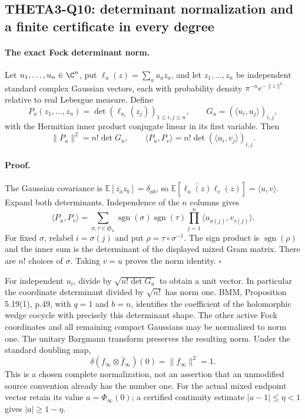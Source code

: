 
\subsection{THETA3-Q10: determinant normalization and a finite certificate in every degree}\label{Q10}

\paragraph{The exact Fock determinant norm.}
Let $u_1,\ldots,u_n\in\C^n$, put
$\ell_u(z)=\sum_a u_a z_a$, and let $z_1,\ldots,z_n$ be independent
standard complex Gaussian vectors, each with probability density
$\pi^{-n}e^{-\|z\|^2}$ relative to real Lebesgue measure. Define
\[
 P_u(z_1,\ldots,z_n)=\det(\ell_{u_i}(z_j))_{1\leq i,j\leq n},
 \qquad G_u=(\langle u_i,u_j\rangle)_{i,j},
\]
with the Hermitian inner product conjugate linear in its first
variable. Then
\begin{equation}\label{Q10-Fock}
 \|P_u\|^2=n!\det G_u,\qquad
 \langle P_u,P_v\rangle
       =n!\det(\langle u_i,v_j\rangle)_{i,j}.
\end{equation}

\paragraph{Proof.}
The Gaussian covariance is
$\mathbb E[\overline{z_a}z_b]=\delta_{ab}$, so
$\mathbb E[\overline{\ell_u(z)}\ell_v(z)]
=\langle u,v\rangle$.
Expand both determinants. Independence of the $n$ columns gives
\[
 \langle P_u,P_v\rangle
 =\sum_{\sigma,\tau\in\mathfrak S_n}
   \operatorname{sgn}(\sigma)\operatorname{sgn}(\tau)
       \prod_{j=1}^n\langle u_{\sigma(j)},v_{\tau(j)}\rangle.
\]
For fixed $\sigma$, relabel $i=\sigma(j)$ and put
$\rho=\tau\circ\sigma^{-1}$. The sign product is
$\operatorname{sgn}(\rho)$ and the inner sum is the determinant
of the displayed mixed Gram matrix. There are $n!$ choices of
$\sigma$. Taking $v=u$ proves the norm identity.
\hfill$\square$

For independent $u_i$, divide by $\sqrt{n!\det G_u}$ to obtain
a unit vector. In particular the coordinate determinant divided
by $\sqrt{n!}$ has norm one. BMM, Proposition 5.19(1), p.49,
with $q=1$ and $b=n$, identifies the coefficient of the
holomorphic wedge cocycle with precisely this determinant shape.
The other active Fock coordinates and all remaining compact
Gaussians may be normalized to norm one. The unitary Bargmann
transform preserves the resulting norm. Under the standard
doubling map,
\[
 \delta(f_\infty\otimes\bar f_\infty)(0)=\|f_\infty\|^2=1.
\]
This is a chosen complete normalization, not an assertion that
an unmodified source convention already has the number one.
For the actual mixed endpoint vector retain its value
$a=\Phi_\infty(0)$; a certified continuity estimate
$|a-1|\leq\eta<1$ gives $|a|\geq1-\eta$.

